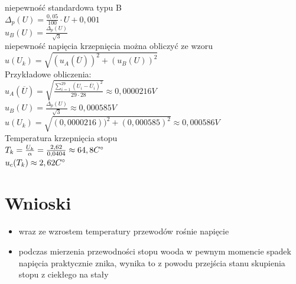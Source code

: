 \documentclass{article}
\begin{document}
niepewność standardowa typu B\\
$\Delta_{p}(U)=\frac{0,05}{100}\cdot U+0,001$\\

$u_{B}(U)=\frac{\Delta_{p}(U)}{\sqrt{3}}$\\

niepewność napięcia krzepnięcia można obliczyć ze wzoru\\
$u(U_{k})=\sqrt{(u_{A}(\overline{U}))^2+(u_{B}(U))^2}$\\

Przykładowe obliczenia:\\
$u_{A}(\overline{U})=\sqrt{\frac{\sum_{i=1}^{29}(U_{i}-\overline{U}_{i})^2}{29\cdot28}}\approx0,0000216V$\\

$u_{B}(U)=\frac{\Delta_{p}(U)}{\sqrt{3}}\approx0,000585V$\\

$u(U_{k})=\sqrt{(0,0000216))^2+(0,000585)^2}\approx0,000586V$\\

Temperatura krzepnięcia stopu\\
$T_{k}=\frac{U_{k}}{\alpha}=\frac{2,62}{0,0404}\approx64,8C\degree$\\

$u_{c}(T_{k})\approx2,62C\degree$\\
\section{Wnioski}
\begin{itemize}
    \item wraz ze wzrostem temperatury przewodów rośnie napięcie
    \item podczas mierzenia przewodności stopu wooda w pewnym momencie spadek napięcia praktycznie znika, wynika to z powodu przejścia stanu skupienia stopu z ciekłego na stały
\end{itemize}
\end{document}
